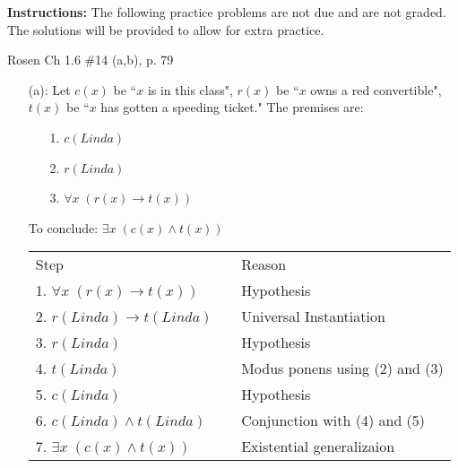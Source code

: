 \documentclass[12pt,addpoints]{exam}
\begin{document}
\extrawidth{0.5in} \extrafootheight{-0in} \pagestyle{headandfoot}
\headrule {} \footrule {}

\noindent \textbf{Instructions:} The following practice problems are
not due and are not graded.  The solutions will be provided to allow
for extra practice.

\begin{questions}
\printanswers

\question Rosen Ch 1.6 \#14 (a,b), p. 79
    \ifprintanswers
        \vspace{-10pt}
    \fi
\begin{solution}
    \begin{itemize}[itemsep=0pt,parsep=0pt,topsep=0pt,partopsep=0pt]
    \item[(a):] Let $c(x)$ be ``$x$ is in this class", $r(x)$ be ``$x$ owns a red convertible", $t(x)$ be ``$x$ has gotten a speeding ticket."  The premises are:
    \begin{itemize}[itemsep=0pt,parsep=0pt,topsep=0pt,partopsep=0pt]
        \item[1.] $c(Linda)$
        \item[2.] $r(Linda)$
        \item[3.] $\forall x\; (r(x) \rightarrow t(x))$
    \end{itemize}
    To conclude: $\exists x\; (c(x) \wedge t(x))$

    \smallskip
    \begin{tabular}{lll}
        Step        & \hspace{0.2in} & Reason \\
        1. $\forall x\; (r(x) \rightarrow t(x))$    &   & Hypothesis \\
        2. $r(Linda) \rightarrow t(Linda)$          &   & Universal Instantiation \\
        3. $r(Linda)$                               &   & Hypothesis \\
        4. $t(Linda)$                               &   & Modus ponens using (2) and (3) \\
        5. $c(Linda)$                               &   & Hypothesis \\
        6. $c(Linda) \wedge t(Linda)$               &   & Conjunction with (4) and (5) \\
        7. $\exists x\; (c(x) \wedge t(x))$         &   & Existential generalizaion \\
    \end{tabular}


\end{itemize}
\end{solution}
\end{questions}
\end{document}
